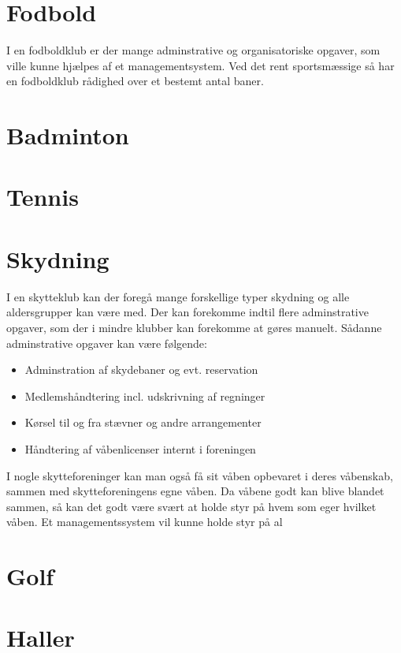 \section{Fodbold}
I en fodboldklub er der mange adminstrative og organisatoriske opgaver, som ville kunne hjælpes af et managementsystem. Ved det rent sportsmæssige så har en fodboldklub rådighed over et bestemt antal baner. 


\section{Badminton}

\section{Tennis}

\section{Skydning}
I en skytteklub kan der foregå mange forskellige typer skydning og alle aldersgrupper kan være med. Der kan forekomme indtil flere adminstrative opgaver, som der i mindre klubber kan forekomme at gøres manuelt. Sådanne adminstrative opgaver kan være følgende:
\begin{itemize}
\item Adminstration af skydebaner og evt. reservation
\item Medlemshåndtering incl. udskrivning af regninger
\item Kørsel til og fra stævner og andre arrangementer
\item Håndtering af våbenlicenser internt i foreningen
\end{itemize}
I nogle skytteforeninger kan man også få sit våben opbevaret i deres våbenskab, sammen med skytteforeningens egne våben. Da våbene godt kan blive blandet sammen, så kan det godt være svært at holde styr på hvem som eger hvilket våben. Et managementssystem vil kunne holde styr på al

\section{Golf}

\section{Haller}
